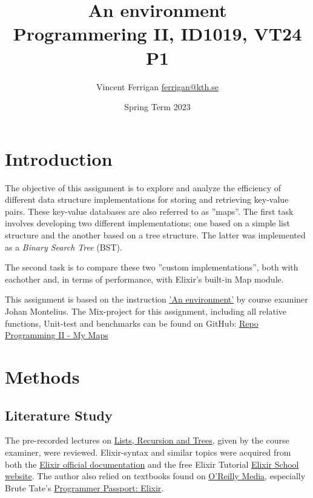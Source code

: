 \documentclass[a4paper,11pt]{article}
\begin{document}
\title{
    An environment
\\\small{Programmering II, ID1019, VT24 P1}
}
\author{Vincent Ferrigan \href{mailto:ferrigan@kth.se}{ferrigan@kth.se}}

\date{Spring Term 2023}

\maketitle

\section*{Introduction}
\label{sec:introduction}
The objective of this assignment is to explore and analyze
the efficiency of
different data structure implementations for storing
and retrieving key-value pairs.
These key-value databases are also referred to as ''maps''.
The first task involves developing two different implementations;
one based on a simple list structure and the
another based on a tree structure.
The latter was implemented as a \emph{Binary Search Tree} (BST).

The second task is to compare these two ''custom implementations'',
both with eachother and, in terms of performance, with
Elixir's built-in Map module.

This assignment is based on the instruction
\href{https://people.kth.se/~johanmon/courses/id1019/seminars/environment/environment.pdf}{'An environment'}
by course examiner Johan Montelius.
The Mix-project for this assignment, including all relative functions, Unit-test and benchmarks can be found on GitHub:
\href{https://github.com/VincentFerrigan/kth-id1019-programming-ii/tree/main/tasks/2/mymaps}{Repo Programming II - My Maps}%

\section*{Methods}
\label{sec:methods}

\subsection*{Literature Study}
\label{subsec:literaturestudy}
The pre-recorded lectures on
\href{https://canvas.kth.se/courses/44911/assignments/syllabus}{Lists, Recursion and Trees},
given by the course examiner, were reviewed.
Elixir-syntax and similar topics were acquired
from both the
\href{https://elixir-lang.org/docs.html}{Elixir official documentation}
and the free Elixir Tutorial
\href{https://elixirschool.com/en}{Elixir School
website}.
The author also relied on textbooks found on
\href{https://learning.oreilly.com}{O'Reilly Media},
especially Brute Tate's
\href{https://learning.oreilly.com/library/view/programmer-passport-elixir/9781680509649/}{Programmer Passport: Elixir}.
\end{document}
